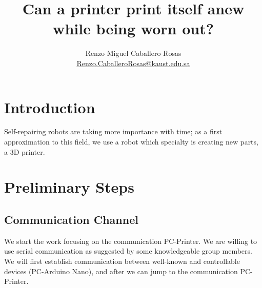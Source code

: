 \documentclass[12pt]{article}
\theoremstyle{definition}
\theoremstyle{remark}
\begin{document}
\title{Can a printer print itself anew while being worn out?}
\author{Renzo Miguel Caballero Rosas\\
\url{Renzo.CaballeroRosas@kaust.edu.sa}} 
\maketitle

\tableofcontents

\section{Introduction}

Self-repairing robots are taking more importance with time; as a first approximation to this field, we use a robot which specialty is creating new parts, a 3D printer.

\section{Preliminary Steps}

\subsection{Communication Channel}

We start the work focusing on the communication PC-Printer. We are willing to use serial communication as suggested by some knowledgeable group members. We will first establish communication between well-known and controllable devices (PC-Arduino Nano), and after we can jump to the communication PC-Printer.
\end{document}
